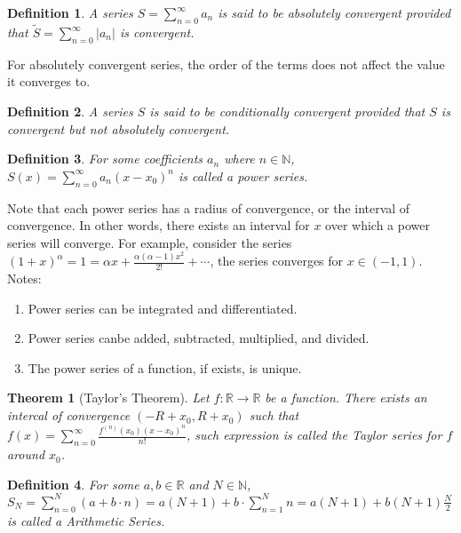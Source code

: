 \documentclass[11pt]{article}
\theoremstyle{break}
\theoremstyle{break}
\newtheorem{thm}{Theorem}[section]
\newtheorem{defn}{Definition}[corL]
\newcommand{\R}{\mathbb{R}}
\newcommand{\N}{\mathbb{N}}
\begin{document}
\begin{defn}
A series $S = \sum_{n=0}^\infty a_n$ is said to be absolutely convergent provided that $\widetilde{S} = \sum_{n=0}^\infty |a_n|$ is convergent.
\end{defn}

For absolutely convergent series, the order of the terms does not affect the value it converges to.\\


\begin{defn}
A series $S$ is said to be conditionally convergent provided that $S$ is convergent but not absolutely convergent.
\end{defn}

\begin{defn}
For some coefficients $a_n$ where $n \in \N$, $S(x) = \sum_{n=0}^\infty a_n(x-x_0)^n$ is called a power series.
\end{defn}

Note that each power series has a radius of convergence, or the interval of convergence. In other words, there exists an interval for $x$ over which a power series will converge. For example, consider the series $(1+x)^\alpha = 1=\alpha x+ \frac{\alpha(\alpha - 1)x^2}{2!}+ \cdots$, the series converges for $x \in (-1,1)$. \\

Notes:
\begin{enumerate}[topsep=3pt,itemsep=-1ex,partopsep=1ex,parsep=1ex]
\item Power series can be integrated and differentiated.
\item Power series canbe added, subtracted, multiplied, and divided.
\item The power series of a function, if exists, is unique.
\end{enumerate}

\begin{thm}[Taylor's Theorem]
Let $f:\R \to \R$ be a function. There exists an intercal of convergence $(-R+x_0,R+x_0)$ such that $f(x) = \sum_{n=0}^\infty \frac{f^{(n)}(x_0)(x-x_0)^n}{n!}$, such expression is called the Taylor series for $f$ around $x_0$.
\end{thm}

\begin{defn}
For some $a,b \in \R$ and $N \in \N$, $S_N = \sum_{n=0}^N (a+b\cdot n) = a(N+1)+b\cdot \sum_{n=1}^N n = a(N+1)+b(N+1)\frac{N}{2}$ is called a Arithmetic Series.
\end{defn}
\end{document}
